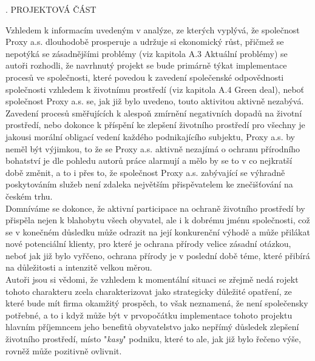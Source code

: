 \newcommand\ProjektovaCast{\texorpdfstring{\MakeUppercase{}.}{} PROJEKTOVÁ ČÁST}
\begin{lefttextpipe}
	{\Large \ProjektovaCast}
\end{lefttextpipe}
\addcontentsline{toc}{section}{\ProjektovaCast}

Vzhledem k informacím uvedeným v analýze, ze kterých vyplývá, že společnost Proxy a.s. dlouhodobě prosperuje a udržuje si ekonomický růst, přičmež se nepotýká se zásadnějšími problémy (viz kapitola A.3 Aktuální problémy) se autoři rozhodli, že navrhnutý projekt se bude primárně týkat implementace procesů ve společnosti, které povedou k zavedení společenské odpovědnosti společnosti vzhledem k životnímu prostředí (viz kapitola A.4 Green deal), neboť společnost Proxy a.s. se, jak již bylo uvedeno, touto aktivitou aktivně nezabývá.\\

Zavedení procesů směřujících k alespoň zmírnění negativních dopadů na životní prostředí, nebo dokonce k příspění ke zlepšení životního prostředí pro všechny je jakousi morální obligací vedení každého podnikajícího subjektu, Proxy a.s. by neměl být výjimkou, to že se Proxy a.s. aktivně nezajímá o ochranu přírodního bohatství je dle pohledu autorů práce alarmují a mělo by se to v co nejkratší době změnit, a to i přes to, že společnost Proxy a.s. zabývající se výhradně poskytováním služeb není zdaleka největším přispěvatelem ke znečišťování na českém trhu.\\

Domníváme se dokonce, že aktivní participace na ochraně životního prostředí by přispěla nejen k blahobytu všech obyvatel, ale i k dobrému jménu společnosti, což se v konečném důsledku může odrazit na její konkurenční výhodě a může přilákat nové potenciální klienty, pro které je ochrana přírody velice zásadní otázkou, neboť jak již bylo vyřčeno, ochrana přírody je v poslední době téme, které přibírá na důležitosti a intenzitě velkou měrou.\\

Autoři jsou si vědomi, že vzhledem k momentální situaci se zřejmě nedá rojekt tohoto charakteru zcela charakterizovat jako strategicky důležité opatření, ze které bude mít firma okamžitý prospěch, to však neznamená, že není společensky potřebné, a to i když může být v prvopočátku implementace tohoto projektu hlavním příjemncem jeho benefitů obyvatelstvo jako nepřímý důsledek zlepšení životního prostředí, místo "\textit{kasy}" podniku, které to ale, jak již bylo řečeno výše, rovněž může pozitivně ovlivnit.\\

